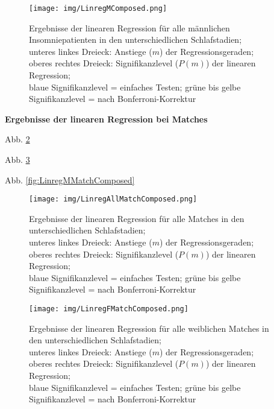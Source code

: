 \begin{figure}[H]
	\centering
	\texttt{[image: img/LinregMComposed.png]}
	\caption[Ergebnisse der linearen Regression für alle männlichen Insomniepatienten]{Ergebnisse der linearen Regression für alle männlichen Insomniepatienten in den unterschiedlichen Schlafstadien;\\unteres linkes Dreieck: Anstiege ($m$) der Regressionsgeraden;\\oberes rechtes Dreieck: Signifikanzlevel ($P(m)$) der linearen Regression;\\blaue Signifikanzlevel = einfaches Testen; grüne bis gelbe Signifikanzlevel = nach Bonferroni-Korrektur}
	\label{fig:LinregMComposed}
\end{figure}




\textbf{Ergebnisse der linearen Regression bei Matches}

Abb. \ref{fig:LinregAllMatchComposed}

Abb. \ref{fig:LinregFMatchComposed}

Abb. \ref{fig:LinregMMatchComposed}




\begin{figure}[H]
	\centering
	\texttt{[image: img/LinregAllMatchComposed.png]}
	\caption[Ergebnisse der linearen Regression für alle Matches]{Ergebnisse der linearen Regression für alle Matches in den unterschiedlichen Schlafstadien;\\unteres linkes Dreieck: Anstiege ($m$) der Regressionsgeraden;\\oberes rechtes Dreieck: Signifikanzlevel ($P(m)$) der linearen Regression;\\blaue Signifikanzlevel = einfaches Testen; grüne bis gelbe Signifikanzlevel = nach Bonferroni-Korrektur}
	\label{fig:LinregAllMatchComposed}
\end{figure}




\begin{figure}[H]
	\centering
	\texttt{[image: img/LinregFMatchComposed.png]}
	\caption[Ergebnisse der linearen Regression für alle weiblichen Matches]{Ergebnisse der linearen Regression für alle weiblichen Matches in den unterschiedlichen Schlafstadien;\\unteres linkes Dreieck: Anstiege ($m$) der Regressionsgeraden;\\oberes rechtes Dreieck: Signifikanzlevel ($P(m)$) der linearen Regression;\\blaue Signifikanzlevel = einfaches Testen; grüne bis gelbe Signifikanzlevel = nach Bonferroni-Korrektur}
	\label{fig:LinregFMatchComposed}
\end{figure}




